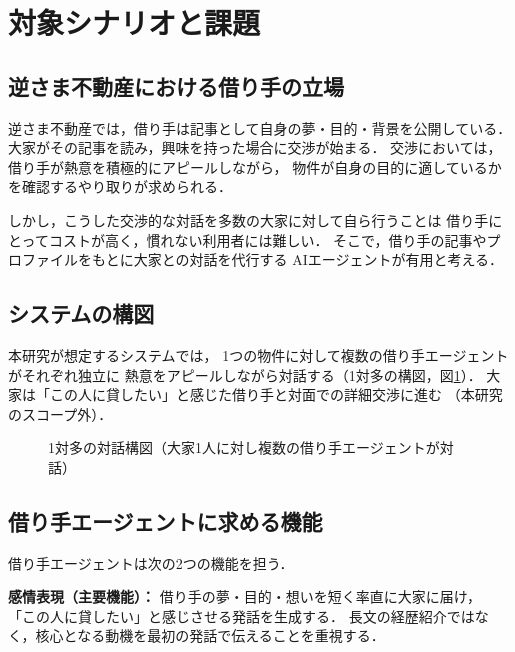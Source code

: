 \documentclass{FITpaper}
\begin{document}
\section{対象シナリオと課題}

\subsection{逆さま不動産における借り手の立場}

逆さま不動産では，借り手は記事として自身の夢・目的・背景を公開している．
大家がその記事を読み，興味を持った場合に交渉が始まる．
交渉においては，借り手が熱意を積極的にアピールしながら，
物件が自身の目的に適しているかを確認するやり取りが求められる．

しかし，こうした交渉的な対話を多数の大家に対して自ら行うことは
借り手にとってコストが高く，慣れない利用者には難しい．
そこで，借り手の記事やプロファイルをもとに大家との対話を代行する
AIエージェントが有用と考える．

\subsection{システムの構図}

本研究が想定するシステムでは，
1つの物件に対して複数の借り手エージェントがそれぞれ独立に
熱意をアピールしながら対話する（1対多の構図，図\ref{fig:system}）．
大家は「この人に貸したい」と感じた借り手と対面での詳細交渉に進む
（本研究のスコープ外）．

\begin{figure}[htbp]
  \centering
  \fbox{\rule{0pt}{3cm}\rule{\columnwidth}{0pt}}
  \caption{1対多の対話構図（大家1人に対し複数の借り手エージェントが対話）}
  \label{fig:system}
\end{figure}

\subsection{借り手エージェントに求める機能}

借り手エージェントは次の2つの機能を担う．

\textbf{感情表現（主要機能）：}
借り手の夢・目的・想いを短く率直に大家に届け，
「この人に貸したい」と感じさせる発話を生成する．
長文の経歴紹介ではなく，核心となる動機を最初の発話で伝えることを重視する．
\end{document}
